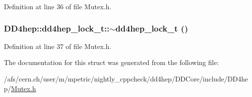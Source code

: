Definition at line 36 of file Mutex.h.\hypertarget{struct_d_d4hep_1_1dd4hep__lock__t_a2da5cda9c173175ccd3c52a2a7c31e85}{
\subsubsection[{$\sim$dd4hep\_\-lock\_\-t}]{\setlength{\rightskip}{0pt plus 5cm}DD4hep::dd4hep\_\-lock\_\-t::$\sim$dd4hep\_\-lock\_\-t ()}}
\label{struct_d_d4hep_1_1dd4hep__lock__t_a2da5cda9c173175ccd3c52a2a7c31e85}


Definition at line 37 of file Mutex.h.

The documentation for this struct was generated from the following file:\begin{DoxyCompactItemize}
\item 
/afs/cern.ch/user/m/mpetric/nightly\_\-cppcheck/dd4hep/DDCore/include/DD4hep/\hyperlink{_mutex_8h}{Mutex.h}\end{DoxyCompactItemize}
